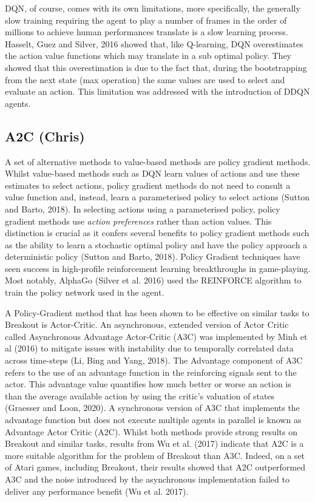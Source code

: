 \documentclass{article}
\begin{document}
DQN, of course, comes with its own limitations, more specifically, the generally slow training requiring the agent to play a number of frames in the order of millions to achieve human performances translate is a slow learning process. Hasselt, Guez and Silver, 2016  showed that, like Q-learning, DQN overestimates the action value functions which may translate in a sub optimal policy. They showed that this overestimation is due to the fact that, during the bootstrapping from the next state (max operation) the same values are used to select and evaluate an action. This limitation was addressed with the introduction of DDQN agents.


\subsection{A2C (Chris)}

A set of alternative methods to value-based methods are policy gradient methods. Whilst value-based methods such as DQN learn values of actions and use these estimates to select actions, policy gradient methods do not need to consult a value function and, instead, learn a parameterised policy to select actions (Sutton and Barto, 2018). In selecting actions using a parameterised policy, policy gradient methods use \emph{action preferences} rather than action values. This distinction is crucial as it confers several benefits to policy gradient methods such as the ability to learn a stochastic optimal policy and have the policy approach a deterministic policy (Sutton and Barto, 2018). Policy Gradient techniques have seen success in high-profile reinforcement learning breakthroughs in game-playing. Most notably, AlphaGo (Silver et al. 2016) used the REINFORCE algorithm to train the policy network used in the agent. 

A Policy-Gradient method that has been shown to be effective on similar tasks to Breakout is Actor-Critic. An asynchronous, extended version of Actor Critic called Asynchronous Advantage Actor-Critic (A3C) was implemented by Minh et al (2016) to mitigate issues with instability due to temporally correlated data across time-steps (Li, Bing and Yang, 2018). The Advantage component of A3C refers to the use of an advantage function in the reinforcing signals sent to the actor. This advantage value quantifies how much better or worse an action is than the average available action by using the critic's valuation of states (Graesser and Loon, 2020). A synchronous version of A3C that implements the advantage function but does not execute multiple agents in parallel is known as Advantage Actor Critic (A2C). Whilst both methods provide strong results on Breakout and similar tasks, results from Wu et al. (2017) indicate that A2C is a more suitable algorithm for the problem of Breakout than A3C. Indeed, on a set of Atari games, including Breakout, their results showed that A2C outperformed A3C and the noise introduced by the asynchronous implementation failed to deliver any performance benefit (Wu et al. 2017). 
\end{document}
